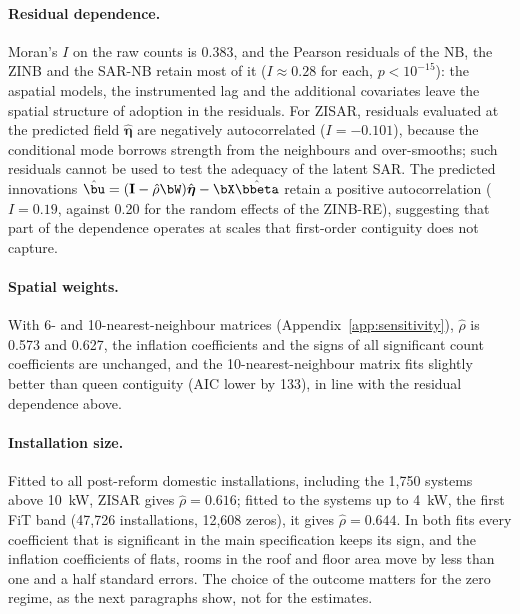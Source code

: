 \paragraph{Residual dependence.}
Moran's $I$ on the raw counts is 0.383, and the Pearson residuals of the NB, the ZINB and the SAR-NB retain most of it ($I \approx 0.28$ for each, $p < 10^{-15}$): the aspatial models, the instrumented lag and the additional covariates leave the spatial structure of adoption in the residuals.
For ZISAR, residuals evaluated at the predicted field $\hat{\boldsymbol\eta}$ are negatively autocorrelated ($I = -0.101$), because the conditional mode borrows strength from the neighbours and over-smooths; such residuals cannot be used to test the adequacy of the latent SAR.
The predicted innovations $\hat\bu = (\mathbf{I}-\hat\rho\bW)\hat{\boldsymbol\eta} - \bX\hat\bbeta$ retain a positive autocorrelation ($I = 0.19$, against 0.20 for the random effects of the ZINB-RE), suggesting that part of the dependence operates at scales that first-order contiguity does not capture.

\paragraph{Spatial weights.}
With 6- and 10-nearest-neighbour matrices (Appendix~\ref{app:sensitivity}), $\hat\rho$ is 0.573 and 0.627, the inflation coefficients and the signs of all significant count coefficients are unchanged, and the 10-nearest-neighbour matrix fits slightly better than queen contiguity (AIC lower by 133), in line with the residual dependence above.

\paragraph{Installation size.}
Fitted to all post-reform domestic installations, including the 1{,}750 systems above 10~kW, ZISAR gives $\hat\rho = 0.616$; fitted to the systems up to 4~kW, the first FiT band (47{,}726 installations, 12{,}608 zeros), it gives $\hat\rho = 0.644$.
In both fits every coefficient that is significant in the main specification keeps its sign, and the inflation coefficients of flats, rooms in the roof and floor area move by less than one and a half standard errors.
The choice of the outcome matters for the zero regime, as the next paragraphs show, not for the estimates.


